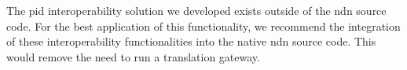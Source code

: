 The \gls{pid} interoperability solution we developed exists outside of the \gls{ndn} source code. For the best application of this functionality, we recommend the integration of these interoperability functionalities into the native \gls{ndn} source code. This would remove the need to run a translation gateway.


